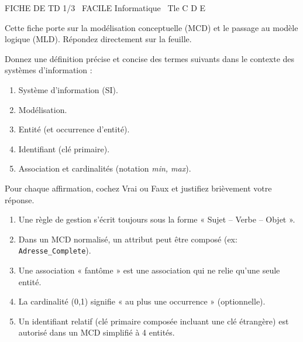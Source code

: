 \documentclass[11pt]{article}
\begin{document}
\begin{tcolorbox}[enhanced,colback=popink,colframe=popink,arc=10pt,boxrule=0pt,left=12pt,right=12pt,top=9pt,bottom=9pt]
{\color{white}\popxbold\small FICHE DE TD 1/3 \textbullet\ FACILE \hfill Informatique \textbullet\ Tle C D E\par}
\end{tcolorbox}
\vspace{4pt}
Cette fiche porte sur la modélisation conceptuelle (MCD) et le passage au modèle logique (MLD). Répondez directement sur la feuille.

\begin{exercice}
Donnez une définition précise et concise des termes suivants dans le contexte des systèmes d'information :
\begin{enumerate}
    \item Système d'information (SI).
    \item Modélisation.
    \item Entité (et occurrence d'entité).
    \item Identifiant (clé primaire).
    \item Association et cardinalités (notation \textit{min, max}).
\end{enumerate}
\end{exercice}

\begin{exercice}
Pour chaque affirmation, cochez Vrai ou Faux et justifiez brièvement votre réponse.
\begin{enumerate}
    \item Une règle de gestion s'écrit toujours sous la forme « Sujet – Verbe – Objet ».
    \item Dans un MCD normalisé, un attribut peut être composé (ex: \texttt{Adresse\_Complete}).
    \item Une association « fantôme » est une association qui ne relie qu'une seule entité.
    \item La cardinalité (0,1) signifie « au plus une occurrence » (optionnelle).
    \item Un identifiant relatif (clé primaire composée incluant une clé étrangère) est autorisé dans un MCD simplifié à 4 entités.
\end{enumerate}
\end{exercice}
\end{document}
